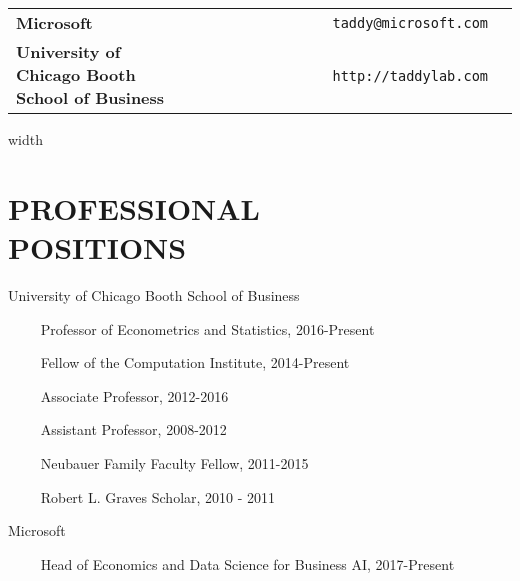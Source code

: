 \documentclass[margin,line]{res}
\begin{document}

\begin{resume}

\medskip
\section{} 
\vspace{.05in}
\begin{tabular}{@{}p{3in}rp{2in}}
{\bf Microsoft} \vspace{.1cm}& {\tt taddy@microsoft.com}\vspace{.1cm}
\\
{\bf University of Chicago Booth School of Business} & ~~~~~~~~~~~~~~~~~{\tt http://taddylab.com}
\end{tabular}



\vspace{.5cm}
\leaders\vrule width \textwidth\vskip0.4pt

\medskip
\section{\bf PROFESSIONAL\\ POSITIONS}

University of Chicago Booth School of Business

\vspace{-.4cm}~~~~ Professor of Econometrics and Statistics, 2016-Present 

\vspace{-.4cm}~~~~ Fellow of the Computation Institute,  2014-Present 

\vspace{-.4cm}~~~~ Associate Professor, 2012-2016


\vspace{-.4cm} ~~~~ Assistant Professor,  2008-2012

\vspace{-.4cm}~~~~ Neubauer Family Faculty Fellow, 2011-2015

\vspace{-.4cm} ~~~~ Robert L. Graves Scholar,  2010 - 2011

\vspace{-.2cm}
Microsoft

\vspace{-.4cm}~~~~ Head of Economics and Data Science for Business AI, 2017-Present



\end{resume}
\end{document}
